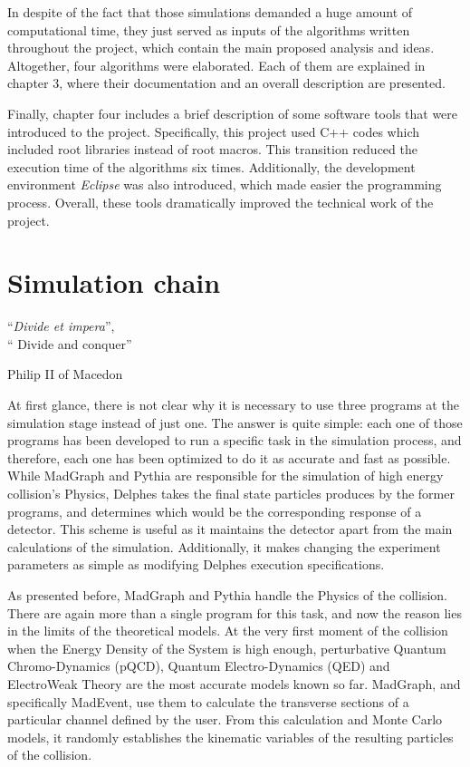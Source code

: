 \documentclass[12pt, oneside]{book}              %
\begin{document}
In despite of the fact that those simulations demanded a huge amount of computational
time, they just served as inputs of the algorithms written throughout the project,
which contain the main proposed analysis and ideas. Altogether, four algorithms
were elaborated. Each of them are explained in chapter 3, where their documentation
and an overall description are presented. 

Finally, chapter four includes a brief description of some software tools that
were introduced to the project. Specifically, this project used C++ codes which
included root libraries instead of root macros. This transition reduced the 
execution time of the algorithms six times. Additionally, the development 
environment \emph{Eclipse} was also introduced, which made easier the programming
process. Overall, these tools dramatically improved the technical work of the project.

\chapter{Simulation chain} \label{cha:Simulation_chain}

\epigraph{\textquotedblleft \textit{Divide et impera}\textquotedblright, \\ \textquotedblleft
Divide and conquer\textquotedblright}{Philip II of Macedon}

At first glance, there is not clear why it is necessary to use three programs at the
simulation stage instead of just one. The answer is quite simple: each one of those
programs has been developed to run a specific task in the simulation process, and 
therefore, each one has been optimized to do it as accurate and fast as possible. 
While MadGraph and Pythia are responsible for the simulation of high energy collision's 
Physics, Delphes takes the final state particles produces by the former programs, and
determines which would be the corresponding response of a detector. This scheme is
useful as it maintains the detector apart from the main calculations of the simulation.
Additionally, it makes changing the experiment parameters as simple as modifying
Delphes execution specifications.

As presented before, MadGraph and Pythia handle the Physics of the collision. There
are again more than a single program for this task, and now the reason lies in the
limits of the theoretical models. At the very first moment of the collision when
the Energy Density of the System is high enough, perturbative Quantum Chromo-Dynamics
(pQCD), Quantum Electro-Dynamics (QED) and ElectroWeak Theory are the most accurate models
known so far. MadGraph, and specifically MadEvent, use them to calculate the transverse
sections of a particular channel defined by the user. From this calculation and Monte 
Carlo models, it randomly establishes the kinematic variables of the resulting particles
of the collision.
\end{document}
